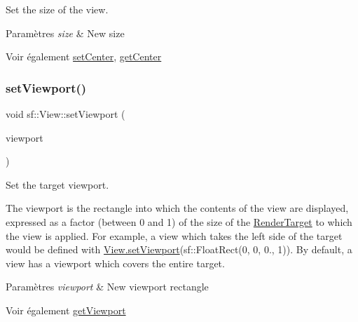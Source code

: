 Set the size of the view. 


\begin{DoxyParams}{Paramètres}
{\em size} & New size\\
\hline
\end{DoxyParams}
\begin{DoxySeeAlso}{Voir également}
\hyperlink{classsf_1_1View_aa8e3fedb008306ff9811163545fb75f2}{set\+Center}, \hyperlink{classsf_1_1View_a7f4443c194c691ae4dcf8fd9dd0eaa46}{get\+Center} 
\end{DoxySeeAlso}
\mbox{\label{classsf_1_1View_a8eaec46b7d332fe834f016d0187d4b4a}} 
\subsubsection{\texorpdfstring{set\+Viewport()}{setViewport()}}
{\footnotesize\ttfamily void sf\+::\+View\+::set\+Viewport (\begin{DoxyParamCaption}\item[{const \hyperlink{classsf_1_1Rect}{Float\+Rect} \&}]{viewport }\end{DoxyParamCaption})}



Set the target viewport. 

The viewport is the rectangle into which the contents of the view are displayed, expressed as a factor (between 0 and 1) of the size of the \hyperlink{classsf_1_1RenderTarget}{Render\+Target} to which the view is applied. For example, a view which takes the left side of the target would be defined with \hyperlink{classsf_1_1View_a8eaec46b7d332fe834f016d0187d4b4a}{View.\+set\+Viewport}(sf\+::\+Float\+Rect(0, 0, 0., 1)). By default, a view has a viewport which covers the entire target.


\begin{DoxyParams}{Paramètres}
{\em viewport} & New viewport rectangle\\
\hline
\end{DoxyParams}
\begin{DoxySeeAlso}{Voir également}
\hyperlink{classsf_1_1View_a93859b4e2e8c191ec741731211a0fb12}{get\+Viewport} 
\end{DoxySeeAlso}
\mbox{\label{classsf_1_1View_a4a72a360a5792fbe4e99cd6feaf7726e}} 

